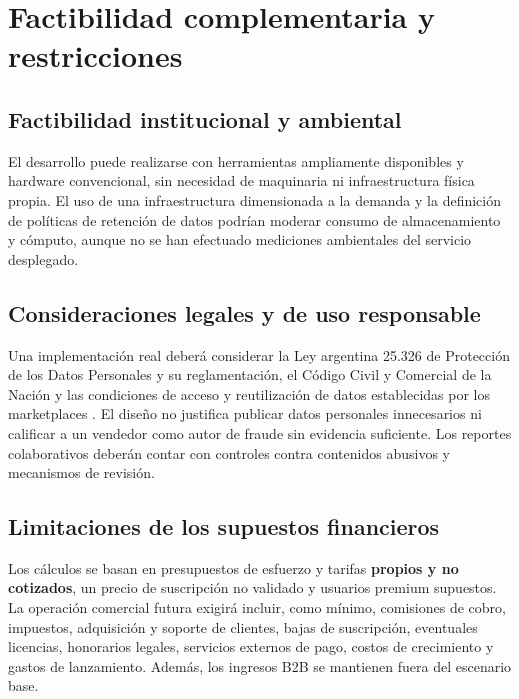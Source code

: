 \section{Factibilidad complementaria y restricciones}\label{sec:ml-factibilidad-complementaria}

\subsection{Factibilidad institucional y ambiental}

El desarrollo puede realizarse con herramientas ampliamente disponibles y hardware convencional, sin necesidad de maquinaria ni infraestructura física propia. El uso de una infraestructura dimensionada a la demanda y la definición de políticas de retención de datos podrían moderar consumo de almacenamiento y cómputo, aunque no se han efectuado mediciones ambientales del servicio desplegado.

\subsection{Consideraciones legales y de uso responsable}

Una implementación real deberá considerar la Ley argentina 25.326 de Protección de los Datos Personales y su reglamentación, el Código Civil y Comercial de la Nación y las condiciones de acceso y reutilización de datos establecidas por los marketplaces \citep{ml-ley25326,ml-decreto1558,ml-ley26994,ml-meli-terminos}. El diseño no justifica publicar datos personales innecesarios ni calificar a un vendedor como autor de fraude sin evidencia suficiente. Los reportes colaborativos deberán contar con controles contra contenidos abusivos y mecanismos de revisión.

\subsection{Limitaciones de los supuestos financieros}\label{subsec:ml-supuestos}

Los cálculos se basan en presupuestos de esfuerzo y tarifas \textbf{propios y no cotizados}, un precio de suscripción no validado y usuarios premium supuestos. La operación comercial futura exigirá incluir, como mínimo, comisiones de cobro, impuestos, adquisición y soporte de clientes, bajas de suscripción, eventuales licencias, honorarios legales, servicios externos de pago, costos de crecimiento y gastos de lanzamiento. Además, los ingresos B2B se mantienen fuera del escenario base.

